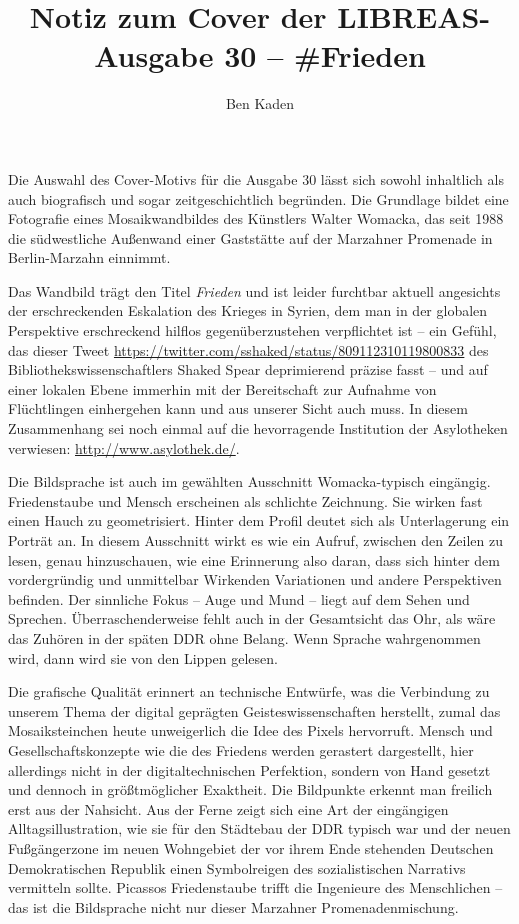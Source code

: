 \documentclass[a4paper,
fontsize=11pt,
oneside,
numbers=noperiodatend,
parskip=half-,
bibliography=totoc,
final
]{scrartcl}
\title{\LARGE{Notiz zum Cover der LIBREAS-Ausgabe 30 -- \#Frieden}
} %
\author{Ben Kaden} %
\date{}
\begin{document}
\maketitle
\thispagestyle{fancyplain} 


Die Auswahl des Cover-Motivs für die Ausgabe 30 lässt sich sowohl
inhaltlich als auch biografisch und sogar zeitgeschichtlich begründen.
Die Grundlage bildet eine Fotografie eines Mosaikwandbildes des
Künstlers Walter Womacka, das seit 1988 die südwestliche Außenwand einer
Gaststätte auf der Marzahner Promenade in Berlin-Marzahn einnimmt.

Das Wandbild trägt den Titel \emph{Frieden} und ist leider furchtbar
aktuell angesichts der erschreckenden Eskalation des Krieges in Syrien,
dem man in der globalen Perspektive erschreckend hilflos
gegenüberzustehen verpflichtet ist -- ein Gefühl, das dieser Tweet
\url{https://twitter.com/sshaked/status/809112310119800833} des
Bibliothekswissenschaftlers Shaked Spear deprimierend präzise fasst --
und auf einer lokalen Ebene immerhin mit der Bereitschaft zur Aufnahme
von Flüchtlingen einhergehen kann und aus unserer Sicht auch muss. In
diesem Zusammenhang sei noch einmal auf die hevorragende Institution der
Asylotheken verwiesen: \url{http://www.asylothek.de/}.

Die Bildsprache ist auch im gewählten Ausschnitt Womacka-typisch
eingängig. Friedenstaube und Mensch erscheinen als schlichte Zeichnung.
Sie wirken fast einen Hauch zu geometrisiert. Hinter dem Profil deutet
sich als Unterlagerung ein Porträt an. In diesem Ausschnitt wirkt es wie
ein Aufruf, zwischen den Zeilen zu lesen, genau hinzuschauen, wie eine
Erinnerung also daran, dass sich hinter dem vordergründig und
unmittelbar Wirkenden Variationen und andere Perspektiven befinden. Der
sinnliche Fokus -- Auge und Mund -- liegt auf dem Sehen und Sprechen.
Überraschenderweise fehlt auch in der Gesamtsicht das Ohr, als wäre das
Zuhören in der späten DDR ohne Belang. Wenn Sprache wahrgenommen wird,
dann wird sie von den Lippen gelesen.

Die grafische Qualität erinnert an technische Entwürfe, was die
Verbindung zu unserem Thema der digital geprägten Geisteswissenschaften
herstellt, zumal das Mosaiksteinchen heute unweigerlich die Idee des
Pixels hervorruft. Mensch und Gesellschaftskonzepte wie die des Friedens
werden gerastert dargestellt, hier allerdings nicht in der
digitaltechnischen Perfektion, sondern von Hand gesetzt und dennoch in
größtmöglicher Exaktheit. Die Bildpunkte erkennt man freilich erst aus
der Nahsicht. Aus der Ferne zeigt sich eine Art der eingängigen
Alltagsillustration, wie sie für den Städtebau der DDR typisch war und
der neuen Fußgängerzone im neuen Wohngebiet der vor ihrem Ende stehenden
Deutschen Demokratischen Republik einen Symbolreigen des sozialistischen
Narrativs vermitteln sollte. Picassos Friedenstaube trifft die
Ingenieure des Menschlichen -- das ist die Bildsprache nicht nur dieser
Marzahner Promenadenmischung.
\end{document}
